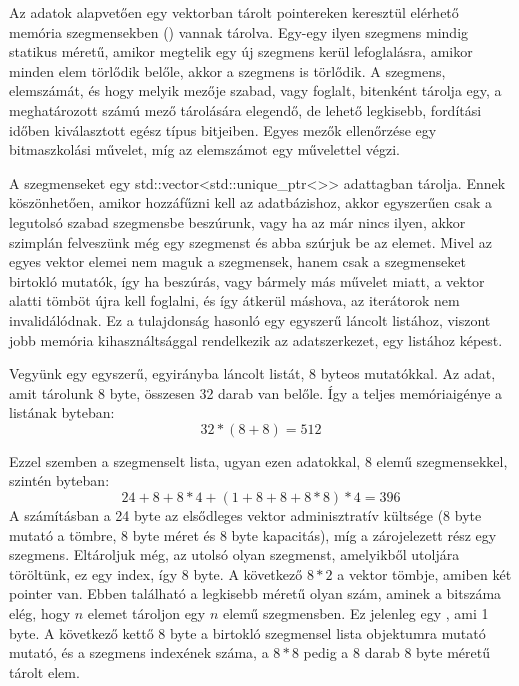 Az adatok alapvetően egy vektorban tárolt pointereken keresztül elérhető memória szegmensekben () vannak tárolva.
Egy-egy ilyen szegmens mindig statikus méretű, amikor megtelik egy új szegmens kerül lefoglalásra, amikor minden elem törlődik
belőle, akkor a szegmens is törlődik.
A szegmens, elemszámát, és hogy melyik mezője szabad, vagy foglalt, bitenként tárolja egy, a meghatározott számú mező tárolására elegendő, de lehető legkisebb, fordítási időben kiválasztott egész típus bitjeiben.
Egyes mezők ellenőrzése egy bitmaszkolási művelet, míg az elemszámot egy  művelettel végzi.

A szegmenseket egy {\ibmmono std::vector<std::unique_ptr<>>} adattagban tárolja.
Ennek köszönhetően, amikor hozzáfűzni kell az adatbázishoz, akkor egyszerűen csak a legutolsó szabad szegmensbe beszúrunk, vagy ha az már nincs ilyen, akkor szimplán felveszünk még egy szegmenst és abba szúrjuk be az elemet.
Mivel az egyes vektor elemei nem maguk a szegmensek, hanem csak a szegmenseket birtokló mutatók, így ha beszúrás, vagy bármely más művelet miatt, a vektor alatti tömböt újra kell foglalni, és így átkerül máshova, az iterátorok nem invalidálódnak.
Ez a tulajdonság hasonló egy egyszerű láncolt listához, viszont jobb memória kihasználtsággal rendelkezik az adatszerkezet, egy listához képest.

Vegyünk egy egyszerű, egyirányba láncolt listát, 8 byteos mutatókkal. Az adat, amit tárolunk 8 byte, összesen 32 darab van belőle.
Így a teljes memóriaigénye a listának byteban: $$ 32 * (8 + 8) = 512 $$

Ezzel szemben a szegmenselt lista, ugyan ezen adatokkal, 8 elemű szegmensekkel, szintén byteban: $$ 24 + 8 + 8 * 4 + (1 + 8 + 8 + 8 * 8) * 4 = 396 $$
A számításban a 24 byte az elsődleges vektor adminisztratív kültsége (8 byte mutató a tömbre, 8 byte méret és 8 byte kapacitás), míg a zárojelezett rész egy szegmens. 
Eltároljuk még, az utolsó olyan szegmenst, amelyikből utoljára töröltünk, ez egy index, így 8 byte.
A következő $8 * 2$ a vektor tömbje, amiben két pointer van.
Ebben található a legkisebb méretű olyan szám, aminek a bitszáma elég, hogy $n$ elemet tároljon egy $n$ elemű szegmensben.
Ez jelenleg egy {\ibmmono {}}, ami 1 byte.
A következő kettő 8 byte a birtokló szegmensel lista objektumra mutató mutató, és a szegmens indexének száma, a $8 * 8$ pedig a 8 darab 8 byte méretű tárolt elem.

